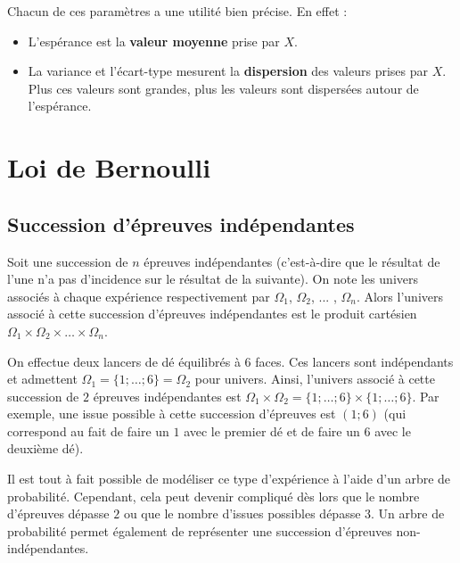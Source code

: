 	Chacun de ces paramètres a une utilité bien précise. En effet :

	\begin{formula}
		\begin{itemize}
			\item L'espérance est la \textbf{valeur moyenne} prise par $X$.
			\item La variance et l'écart-type mesurent la \textbf{dispersion} des valeurs prises par $X$. Plus ces valeurs sont grandes, plus les valeurs sont dispersées autour de l'espérance.
		\end{itemize}
	\end{formula}

	\section{Loi de Bernoulli}

	\subsection{Succession d'épreuves indépendantes}

	\begin{formula}
		Soit une succession de $n$ épreuves indépendantes (c'est-à-dire que le résultat de l'une n'a pas d'incidence sur le résultat de la suivante). On note les univers associés à chaque expérience respectivement par $\Omega_1$, $\Omega_2$, ... , $\Omega_n$.
		\newpar
		Alors l'univers associé à cette succession d'épreuves indépendantes est le produit cartésien $\Omega_1 \times \Omega_2 \times \dots \times \Omega_n$.
	\end{formula}

	\begin{tip}[Exemple]
		On effectue deux lancers de dé équilibrés à $6$ faces. Ces lancers sont indépendants et admettent $\Omega_1 = \{1; \dots; 6\} = \Omega_2$ pour univers.
		\newpar
		Ainsi, l'univers associé à cette succession de $2$ épreuves indépendantes est $\Omega_1 \times \Omega_2 = \{1; \dots; 6\} \times \{1; \dots; 6\}$.
		\newpar
		Par exemple, une issue possible à cette succession d'épreuves est $(1; 6)$ (qui correspond au fait de faire un $1$ avec le premier dé et de faire un $6$ avec le deuxième dé).
	\end{tip}

	\begin{tip}
		Il est tout à fait possible de modéliser ce type d'expérience à l'aide d'un arbre de probabilité. Cependant, cela peut devenir compliqué dès lors que le nombre d'épreuves dépasse $2$ ou que le nombre d'issues possibles dépasse $3$.
		\newpar
		Un arbre de probabilité permet également de représenter une succession d'épreuves non-indépendantes.
	\end{tip}

